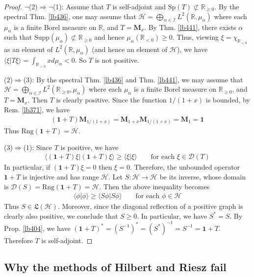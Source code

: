 \documentclass[12pt,b5paper,notitlepage]{article}
\theoremstyle{definition}
\theoremstyle{plain}
\newcommand{\fk}{\mathfrak}
\newcommand{\idt}{\mathbf{1}}
\newcommand{\Dom}{\mathscr{D}}
\newcommand{\bk}[1]{\langle {#1}\rangle}
\newcommand{\Rbb}{\mathbb R}
\newcommand{\Sp}{\mathrm{Sp}}
\newcommand{\Rng}{\mathrm{Rng}}
\newcommand{\Supp}{\mathrm{Supp}}
\newcommand{\MH}{\mathcal H}
\newcommand{\SI}{\mathscr I}
\newcommand{\Mbf}{\mathbf M}
\numberwithin{equation}{section}
\begin{document}
\begin{proof}
$\neg$(2)$\Rightarrow$$\neg$(1): Assume that $T$ is self-adjoint and $\Sp(T)\nsubset\Rbb_{\geq0}$. By the spectral Thm. \ref{lb436}, one may assume that $\MH=\bigoplus_{\alpha\in\SI}L^2(\Rbb,\mu_\alpha)$ where each $\mu_\alpha$ is a finite Borel measure on $\Rbb$, and $T=\Mbf_x$. By Thm. \ref{lb441}, there exists $\alpha$ such that $\Supp(\mu_\alpha)\nsubset\Rbb_{\geq0}$ and hence $\mu_\alpha(\Rbb_{<0})\geq0$. Thus, viewing $\xi=\chi_{\Rbb_{<0}}$ as an element of $L^2(\Rbb,\mu_\alpha)$ (and hence an element of $\MH$), we have $\bk{\xi|T\xi}=\int_{\Rbb_{<0}}xd\mu_\alpha<0$. So $T$ is not positive.

(2)$\Rightarrow$(3): By the spectral Thm. \ref{lb436} and Thm. \ref{lb441}, we may assume that $\MH=\bigoplus_{\alpha\in\SI}L^2(\Rbb_{\geq0},\mu_\alpha)$ where each $\mu_\alpha$ is a finite Borel measure on $\Rbb_{\geq0}$, and $T=\Mbf_x$. Then $T$ is clearly positive. Since the function $1/(1+x)$ is bounded, by Rem. \ref{lb371}, we have
\begin{align*}
(\idt+T)\Mbf_{1/(1+x)}=\Mbf_{1+x}\Mbf_{1/(1+x)}=\Mbf_1=\idt
\end{align*} 
Thus $\Rng(\idt+T)=\MH$.

(3)$\Rightarrow$(1): Since $T$ is positive, we have
\begin{align*}
\bk{(\idt+T)\xi|(\idt+T)\xi}\geq \bk{\xi|\xi}\qquad\text{for each }\xi\in\Dom(T)
\end{align*}
In particular, if $(\idt+T)\xi=0$ then $\xi=0$. Therefore, the unbounded operator $\idt+T$ is injective and has range $\MH$. Let $S:\MH\rightarrow\MH$ be its inverse, whose domain is $\Dom(S)=\Rng(\idt+T)=\MH$. Then the above inequality becomes
\begin{align*}
\bk{\phi|\phi}\geq\bk{S\phi|S\phi}\qquad\text{for each }\phi\in\MH
\end{align*}
Thus $S\in\fk L(\MH)$. Moreover, since the diagonal reflection of a positive graph is clearly also positive, we conclude that $S\geq0$. In particular, we have $S^*=S$. By Prop. \ref{lb404}, we have $(\idt+T)^*=(S^{-1})^*=(S^*)^{-1}=S^{-1}=\idt+T$. Therefore $T$ is self-adjoint.
\end{proof}




\subsection{Why the methods of Hilbert and Riesz fail}
\end{document}
